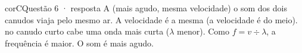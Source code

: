 \begin{comentario}{corC}{Questão 6 · resposta A (mais agudo, mesma velocidade)}
 o som dos dois canudos viaja pelo mesmo ar. A velocidade é a mesma (a velocidade é do meio).
 no canudo curto cabe uma onda mais curta ($\lambda$ menor). Como $f = v \div \lambda$, a frequência é maior. O som é mais agudo.
\end{comentario}
